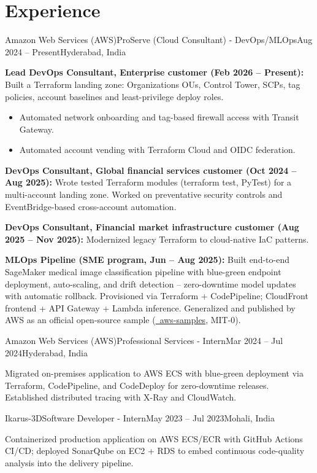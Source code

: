\section{\textbf{Experience}}
\resumeSubHeadingListStart

\resumeExp
{Amazon Web Services (AWS)}{ProServe (Cloud Consultant) - DevOps/MLOps}{Aug 2024 -- Present}{Hyderabad, India}
\resumeItemListStart
    \item[$\diamond$] \textbf{Lead DevOps Consultant, Enterprise customer (Feb 2026 -- Present):} Built a Terraform landing zone: Organizations OUs, Control Tower, SCPs, tag policies, account baselines and least-privilege deploy roles.
    \begin{itemize}[leftmargin=2.5ex, noitemsep, topsep=0pt, labelsep=1.2mm]
        \item[$\circ$] Automated network onboarding and tag-based firewall access with Transit Gateway.
        \item[$\circ$] Automated account vending with Terraform Cloud and OIDC federation.
    \end{itemize}
    \item[$\diamond$] \textbf{DevOps Consultant, Global financial services customer (Oct 2024 -- Aug 2025):} Wrote tested Terraform modules (terraform test, PyTest) for a multi-account landing zone. Worked on preventative security controls and EventBridge-based cross-account automation.
    \item[$\diamond$] \textbf{DevOps Consultant, Financial market infrastructure customer (Aug 2025 -- Nov 2025):} Modernized legacy Terraform to cloud-native IaC patterns.
    \item[$\diamond$] \textbf{MLOps Pipeline (SME program, Jun -- Aug 2025):} Built end-to-end SageMaker medical image classification pipeline with blue-green endpoint deployment, auto-scaling, and drift detection -- zero-downtime model updates with automatic rollback. Provisioned via Terraform + CodePipeline; CloudFront frontend + API Gateway + Lambda inference. Generalized and published by AWS as an official open-source sample (\href{https://github.com/aws-samples/sample-sagemaker-image-classification-mlops}{\faGithub\ aws-samples}, MIT-0).
\resumeItemListEnd

\resumeExp
{Amazon Web Services (AWS)}{Professional Services - Intern}{Mar 2024 -- Jul 2024}{Hyderabad, India}
\resumeItemListStart
    \item[$\diamond$] Migrated on-premises application to AWS ECS with blue-green deployment via Terraform, CodePipeline, and CodeDeploy for zero-downtime releases. Established distributed tracing with X-Ray and CloudWatch.
\resumeItemListEnd

\resumeExp
{Ikarus-3D}{Software Developer - Intern}{May 2023 -- Jul 2023}{Mohali, India}
\resumeItemListStart
    \item[$\diamond$] Containerized production application on AWS ECS/ECR with GitHub Actions CI/CD; deployed SonarQube on EC2 + RDS to embed continuous code-quality analysis into the delivery pipeline.
\resumeItemListEnd

\resumeSubHeadingListEnd
